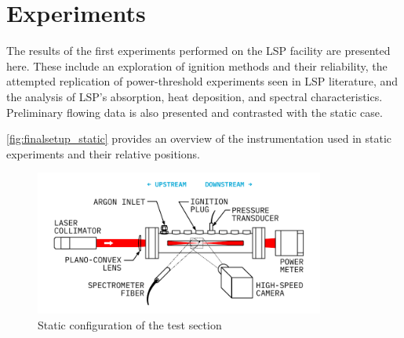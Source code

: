 \chapter{Experiments}
    The results of the first experiments performed on the LSP facility are presented here. These include an exploration of ignition methods and their reliability, the attempted replication of power-threshold experiments seen in LSP literature, and the analysis of LSP's absorption, heat deposition, and spectral characteristics. Preliminary flowing data is also presented and contrasted with the static case.

    \autoref{fig:finalsetup_static} provides an overview of the instrumentation used in static experiments and their relative positions.

    \begin{figure}[h]
        \centering
        \includegraphics[width=0.85\textwidth]{assets/5 results/finalsetup_static}
        \caption{Static configuration of the test section}
        \label{fig:finalsetup_static}
    \end{figure}


